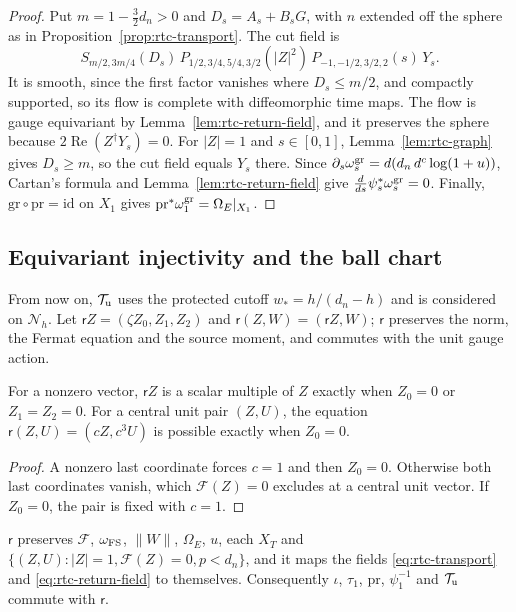 \begin{proof}
Put $m=1-\frac32d_n>0$ and $D_s=A_s+B_sG$, with $n$ extended off the sphere as in Proposition~\ref{prop:rtc-transport}. The cut field is
\[
 S_{m/2,3m/4}(D_s)\,P_{1/2,3/4,5/4,3/2}(|Z|^2)\,P_{-1,-1/2,3/2,2}(s)\,Y_s .
\]
It is smooth, since the first factor vanishes where $D_s\le m/2$, and compactly supported, so its flow is complete with diffeomorphic time maps. The flow is gauge equivariant by Lemma~\ref{lem:rtc-return-field}, and it preserves the sphere because $2\operatorname{Re}(Z^\dagger Y_s)=0$. For $|Z|=1$ and $s\in[0,1]$, Lemma~\ref{lem:rtc-graph} gives $D_s\ge m$, so the cut field equals $Y_s$ there. Since $\partial_s\omega^{\rm gr}_s=d(d_n\,d^c\log(1+u))$, Cartan's formula and Lemma~\ref{lem:rtc-return-field} give $\frac d{ds}\psi_s^*\omega^{\rm gr}_s=0$. Finally, $\mathrm{gr}\circ\mathrm{pr}=\mathrm{id}$ on $X_1$ gives $\mathrm{pr}^*\omega^{\rm gr}_1=\Omega_E|_{X_1}$.
\end{proof}

\subsection{Equivariant injectivity and the ball chart}\label{sec:rtc-avoid}

From now on, $\mathcal T_{\rm u}$ uses the protected cutoff $w_*=h/(d_n-h)$ and is considered on $\mathcal N_h$. Let $\mathsf r Z=(\zeta Z_0,Z_1,Z_2)$ and $\mathsf r(Z,W)=(\mathsf r Z,W)$; $\mathsf r$ preserves the norm, the Fermat equation and the source moment, and commutes with the unit gauge action.

\begin{lemma}\label{lem:rtc-fixed}
For a nonzero vector, $\mathsf r Z$ is a scalar multiple of $Z$ exactly when $Z_0=0$ or $Z_1=Z_2=0$.
For a central unit pair $(Z,U)$, the equation $\mathsf r(Z,U)=(cZ,c^3U)$ is possible exactly when $Z_0=0$.
\end{lemma}

\begin{proof}
A nonzero last coordinate forces $c=1$ and then $Z_0=0$. Otherwise both last coordinates vanish, which $\mathcal F(Z)=0$ excludes at a central unit vector. If $Z_0=0$, the pair is fixed with $c=1$.
\end{proof}

\begin{lemma}[Equivariance]\label{lem:rtc-equivariant}
$\mathsf r$ preserves $\mathcal F$, $\omega_{\rm FS}$, $\|W\|$, $\Omega_E$, $u$, each $X_T$ and $\{(Z,U):|Z|=1,\mathcal F(Z)=0,p<d_n\}$, and it maps the fields
\eqref{eq:rtc-transport} and \eqref{eq:rtc-return-field} to themselves. Consequently $\iota$, $\tau_1$, $\mathrm{pr}$, $\psi_1^{-1}$ and
$\mathcal T_{\rm u}$ commute with $\mathsf r$.
\end{lemma}


